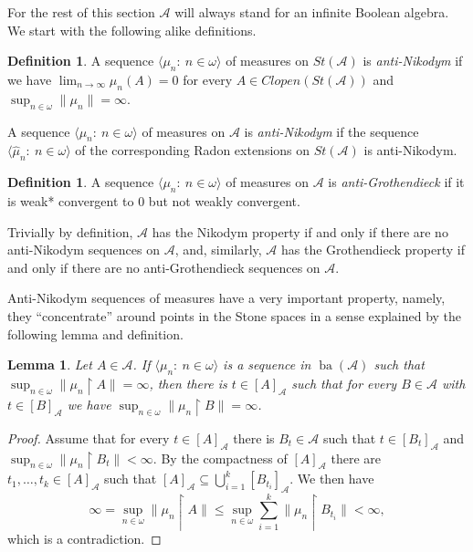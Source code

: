 \documentclass[a4paper,11pt,fleqn]{amsart}
\newtheorem{lemma}[theorem]{Lemma}
\theoremstyle{definition}
\newtheorem{definition}[theorem]{Definition}
\theoremstyle{remark}
\numberwithin{equation}{section}
\newcommand{\N}{\mathbb{N}}
\newcommand{\aA}{\mathcal{A}}
\DeclareMathOperator{\ba}{ba}
\newcommand{\rstr}{\restriction}
\newcommand{\wh}{\widehat}
\newcommand{\seqn}[1]{\big\langle#1\colon\ n\io\big\rangle}
\newcommand{\clopen}[1]{\left[#1\right]}
\newcommand{\iA}{\in\aA}
\newcommand{\io}{\in\omega}%
\begin{document}
For the rest of this section $\aA$ will always stand for an infinite Boolean algebra. We start with the following alike definitions.%

\begin{definition}\label{def:anti_nik_alg}
    A sequence $\seqn{\mu_n}$ of measures on $St(\aA)$ is \textit{anti-Nikodym} if we have $\lim_{n\to\infty}\mu_n(A)=0$ for every $A\in Clopen(St(\aA))$ and $\sup_{n\io}\big\|\mu_n\big\|=\infty$.

    A sequence $\seqn{\mu_n}$ of measures on $\aA$ is \textit{anti-Nikodym} if the sequence $\seqn{\wh{\mu}_n}$ of the corresponding Radon extensions on $St(\aA)$ is anti-Nikodym.
\end{definition}

\begin{definition}
    A sequence $\seqn{\mu_n}$ of measures on $\aA$ is \textit{anti-Grothendieck} if it is weak* convergent to $0$ but not weakly convergent.
\end{definition}

Trivially by definition, $\aA$ has the Nikodym property if and only if there are no anti-Nikodym sequences on $\aA$, and, similarly, $\aA$ has the Grothendieck property if and only if there are no anti-Grothendieck sequences on $\aA$.

Anti-Nikodym sequences of measures have a very important property, namely, they ``concentrate'' around points in the Stone spaces in a sense explained by the following lemma and definition.

\begin{lemma}\label{lemma:Ncp_exists}
    Let $A\in\aA$. If $\seqn{\mu_n}$ is a sequence in $\ba(\aA)$ such that $\sup_{n\io}\big\|\mu_n\rstr A\big\|=\infty$, then there is $t\in\clopen{A}_\aA$ such that for every $B\iA$ with $t\in\clopen{B}_\aA$ we have $\sup_{n\io}\big\|\mu_n\rstr B\big\|=\infty$.
\end{lemma}
\begin{proof}
Assume that for every $t\in\clopen{A}_\aA$ there is $B_t\in\aA$ such that $t\in\clopen{B_t}_\aA$ and $\sup_{n\io}\big\|\mu_n\rstr B_t\big\|<\infty$. By the compactness of $\clopen{A}_\aA$ there are $t_1,\ldots,t_k\in\clopen{A}_\aA$ such that $\clopen{A}_\aA\subseteq\bigcup_{i=1}^k\clopen{B_{t_i}}_\aA$. We then have
\[\infty=\sup_{n\io}\big\|\mu_n\rstr A\big\|\le\sup_{n\io}\sum_{i=1}^k\big\|\mu_n\rstr B_{t_i}\big\|<\infty,\]
which is a contradiction.
\end{proof}
%
\end{document}

